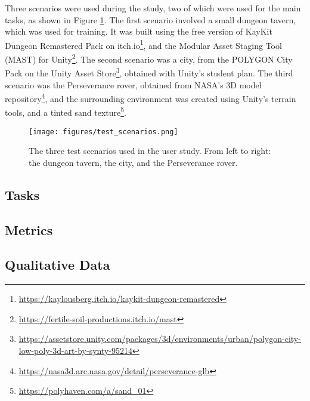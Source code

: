         Three scenarios were used during the study, two of which were used for the main tasks, as shown in Figure \ref{fig:test_scenarios}. The first scenario involved a small dungeon tavern, which was used for training. It was built using the free version of KayKit Dungeon Remastered Pack on itch.io\footnote{\url{https://kaylousberg.itch.io/kaykit-dungeon-remastered}}, and the Modular Asset Staging Tool (MAST) for Unity\footnote{\url{https://fertile-soil-productions.itch.io/mast}}. The second scenario was a city, from the POLYGON City Pack on the Unity Asset Store\footnote{\url{https://assetstore.unity.com/packages/3d/environments/urban/polygon-city-low-poly-3d-art-by-synty-95214}}, obtained with Unity's student plan. The third scenario was the Perseverance rover, obtained from NASA's 3D model repository\footnote{\url{https://nasa3d.arc.nasa.gov/detail/perseverance-glb}}, and the surrounding environment was created using Unity's terrain tools, and a tinted sand texture\footnote{\url{https://polyhaven.com/a/sand_01}}.


        \begin{figure}[h]
            \centering
            \texttt{[image: figures/test\_scenarios.png]}
            \caption{The three test scenarios used in the user study. From left to right: the dungeon tavern, the city, and the Perseverance rover.}
            \label{fig:test_scenarios}
        \end{figure}



    \subsection{Tasks} \label{sec:tasks}

    \subsection{Metrics} \label{sec:evaluation_metrics}

    \subsection{Qualitative Data} \label{sec:qualitative_data}

